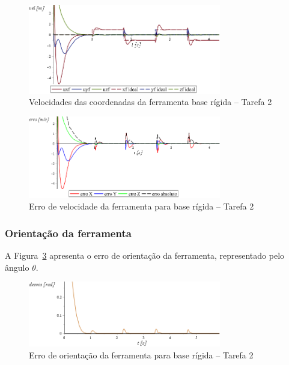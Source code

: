 \begin{figure}[h!]
	\centering 
 	\includegraphics[width=0.75\textwidth]{figs/t2_velf_base_rig}
 	\caption{Velocidades das coordenadas da ferramenta base rígida -- Tarefa
 	2}
 	\label{fig::t2_velf_base_rig}
\end{figure}

\begin{figure}[h!]
	\centering 
 	\includegraphics[width=0.75\textwidth]{figs/t2_errovelf_base_rig}
 	\caption{Erro de velocidade da ferramenta para base rígida -- Tarefa 2}
 	\label{fig::t2_errovelf_base_rig}
\end{figure}


\subsubsection{Orientação da ferramenta}

A Figura~\ref{fig::t2_erroori_base_rig} apresenta o erro de orientação da
ferramenta, representado pelo ângulo $\theta$.

\begin{figure}[h!]
	\centering 
 	\includegraphics[width=0.75\textwidth]{figs/t2_erroori_base_rig}
 	\caption{Erro de orientação da ferramenta para base rígida -- Tarefa
 	2}
 	\label{fig::t2_erroori_base_rig}
\end{figure}


